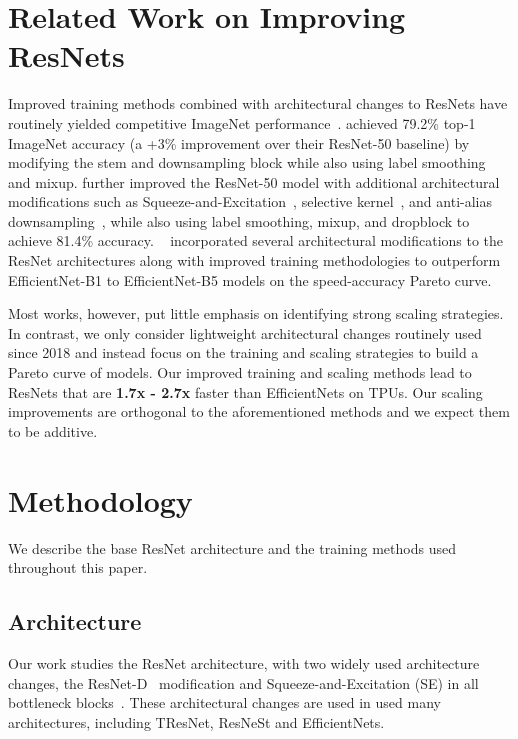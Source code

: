 \documentclass{article}
\begin{document}
\section{Related Work on Improving ResNets}
Improved training methods combined with architectural changes to ResNets have routinely yielded competitive ImageNet performance~\cite{he2019bag,lee2020compounding,ridnik2020tresnet,zhang2020resnest,bello2021lambdanetworks,brock2021highperformance}.
\citet{he2019bag} achieved 79.2\% top-1 ImageNet accuracy (a +3\% improvement over their ResNet-50 baseline) by modifying the stem and downsampling block while also using label smoothing and mixup. 
\citet{lee2020compounding} further improved the ResNet-50 model with additional architectural modifications such as Squeeze-and-Excitation~\cite{hu2018squeeze}, selective kernel~\cite{li2019selective}, and anti-alias downsampling~\cite{zhang2019making}, while also using label smoothing, mixup, and dropblock to achieve 81.4\% accuracy.
~\citet{ridnik2020tresnet} incorporated several architectural modifications to the ResNet architectures along with improved training methodologies to outperform EfficientNet-B1 to EfficientNet-B5 models on the speed-accuracy Pareto curve.

Most works, however, put little emphasis on identifying strong scaling strategies.
In contrast, we only consider lightweight architectural changes routinely used since 2018 and instead focus on the training and scaling strategies to build a Pareto curve of models.
Our improved training and scaling methods lead to ResNets that are \textbf{1.7x - 2.7x} faster than EfficientNets on TPUs.
Our scaling improvements are orthogonal to the aforementioned methods and we expect them to be additive.
 \section{Methodology}
We describe the base ResNet architecture and the training methods used throughout this paper.

\subsection{Architecture}
Our work studies the ResNet architecture, with two widely used architecture changes, the ResNet-D~\cite{he2019bag} modification and Squeeze-and-Excitation (SE) in all bottleneck blocks~\cite{hu2018squeeze}. These architectural changes are used in used many architectures, including TResNet, ResNeSt and EfficientNets.
\end{document}
